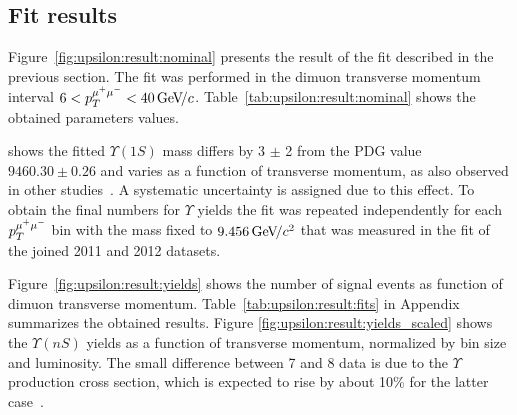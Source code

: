 \subsection{Fit results}
\label{sec:upsilon:result}

Figure~\ref{fig:upsilon:result:nominal} presents the result of the fit 
described in the previous section. The fit was performed in the dimuon
transverse momentum interval $ 6 < p_T^{\mu^+\mu^-} < 40 {\mathrm{\,Ge\kern -0.1em V\!/}c}$.
Table~\ref{tab:upsilon:result:nominal} shows the obtained parameters values. 







% 


 shows  the fitted $\Upsilon(1S)$
mass differs by 3 $\pm$ 2 \mevcc from the PDG value $9460.30 \pm  0.26$ \mevcc and
varies as a function of transverse momentum, as also observed in other
studies~\cite{Aaij:2013yaa}. A systematic uncertainty is assigned due to this
effect. To obtain the final numbers for $\Upsilon$ yields the fit was repeated
independently for each $p_T^{\mu^+\mu^-}$ bin with the \OneS mass fixed to
$9.456 {\mathrm{\,Ge\kern -0.1em V\!/}c^2}$ that was measured in the fit of the joined 2011 and 2012 datasets.

Figure~\ref{fig:upsilon:result:yields} shows the number of signal events as
function of dimuon transverse momentum. Table~\ref{tab:upsilon:result:fits} in
Appendix summarizes the obtained results. Figure
\ref{fig:upsilon:result:yields_scaled} shows the $\Upsilon(nS)$ yields as a
function of transverse momentum, normalized by bin size and luminosity. The
small difference between 7 and 8 \tev data is due to the $\Upsilon$ production
cross section, which is expected to rise by about 10\% for the latter
case~\cite{LHCb-PAPER-2011-036,Aaij:2013yaa}.




